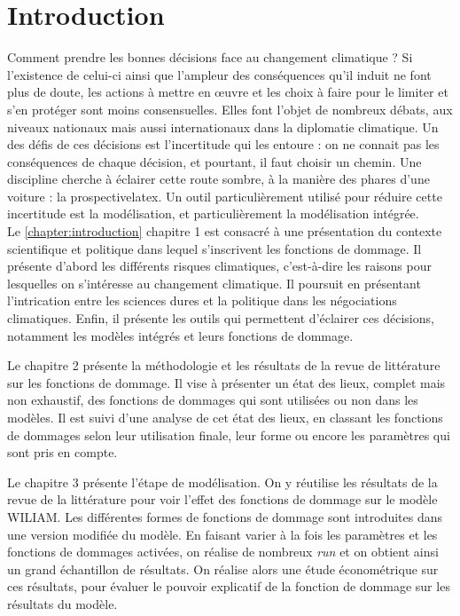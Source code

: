 \chapter*{Introduction}




Comment prendre les bonnes décisions face au changement climatique ? Si l'existence de celui-ci ainsi que l'ampleur des conséquences qu'il induit ne font plus de doute, les actions à mettre en œuvre et les choix à faire pour le limiter et s'en protéger sont moins consensuelles. Elles font l'objet de nombreux débats, aux niveaux nationaux mais aussi internationaux dans la diplomatie climatique. Un des défis de ces décisions est l'incertitude qui les entoure : on ne connait pas les conséquences de chaque décision, et pourtant, il faut choisir un chemin. Une discipline cherche à éclairer cette route sombre, à la manière des phares d'une voiture : la prospective\Gls{latex}. Un outil particulièrement utilisé pour réduire cette incertitude est la modélisation, et particulièrement la modélisation intégrée. \\





Le \ref{chapter:introduction} chapitre 1 est consacré à une présentation du contexte scientifique et politique dans lequel s'inscrivent les fonctions de dommage. Il présente d'abord les différents risques climatiques, c'est-à-dire les raisons pour lesquelles on s'intéresse au changement climatique. Il poursuit en présentant l'intrication entre les sciences dures et la politique dans les négociations climatiques. Enfin, il présente les outils qui permettent d'éclairer ces décisions, notamment les modèles intégrés et leurs fonctions de dommage. 

Le chapitre 2 présente la méthodologie et les résultats de la revue de littérature sur les fonctions de dommage. Il vise à présenter un état des lieux, complet mais non exhaustif, des fonctions de dommages qui sont utilisées ou non dans les modèles. Il est suivi d'une analyse de cet état des lieux, en classant les fonctions de dommages selon leur utilisation finale, leur forme ou encore les paramètres qui sont pris en compte. 

Le chapitre 3 présente l'étape de modélisation. On y réutilise les résultats de la revue de la littérature pour voir l'effet des fonctions de dommage sur le modèle WILIAM. Les différentes formes de fonctions de dommage sont introduites dans une version modifiée du modèle. En faisant varier à la fois les paramètres et les fonctions de dommages activées, on réalise de nombreux \textit{run} et on obtient ainsi un grand échantillon de résultats. On réalise alors une étude économétrique sur ces résultats, pour évaluer le pouvoir explicatif de la fonction de dommage sur les résultats du modèle. 

